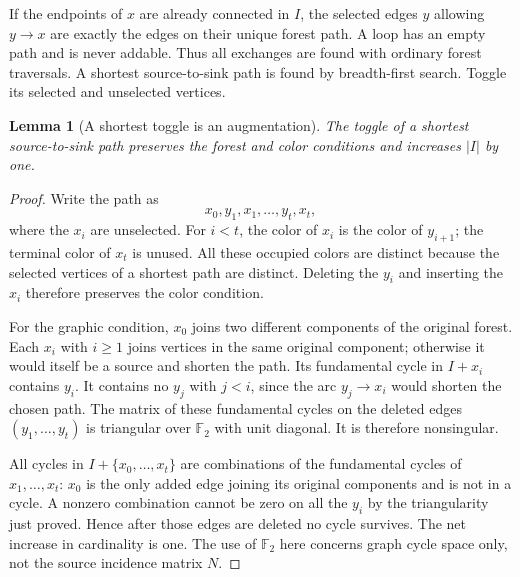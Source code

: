 \documentclass[11pt,letterpaper]{article}
\newtheorem{lemma}[theorem]{Lemma}
\theoremstyle{definition}
\theoremstyle{remark}
\newcommand{\F}{\mathbb F}
\begin{document}
If the endpoints of $x$ are already connected in $I$, the selected edges $y$
allowing $y\to x$ are exactly the edges on their unique forest path. A loop has
an empty path and is never addable. Thus all exchanges are found with ordinary
forest traversals. A shortest source-to-sink path is found by breadth-first
search. Toggle its selected and unselected vertices.

\begin{lemma}[A shortest toggle is an augmentation]\label{lem:augment}
The toggle of a shortest source-to-sink path preserves the forest and color
conditions and increases $|I|$ by one.
\end{lemma}
\begin{proof}
Write the path as
\[
 x_0,y_1,x_1,\ldots,y_t,x_t,
\]
where the $x_i$ are unselected. For $i<t$, the color of $x_i$ is the color of
$y_{i+1}$; the terminal color of $x_t$ is unused. All these occupied colors are
distinct because the selected vertices of a shortest path are distinct. Deleting
the $y_i$ and inserting the $x_i$ therefore preserves the color condition.

For the graphic condition, $x_0$ joins two different components of the original
forest. Each $x_i$ with $i\ge1$ joins vertices in the same original component;
otherwise it would itself be a source and shorten the path. Its fundamental
cycle in $I+x_i$ contains $y_i$. It contains no $y_j$ with $j<i$, since the arc
$y_j\to x_i$ would shorten the chosen path. The matrix of these fundamental
cycles on the deleted edges $(y_1,\ldots,y_t)$ is triangular over $\F_2$ with
unit diagonal. It is therefore nonsingular.

All cycles in $I+\{x_0,\ldots,x_t\}$ are combinations of the fundamental cycles
of $x_1,\ldots,x_t$: $x_0$ is the only added edge joining its original components
and is not in a cycle. A nonzero combination cannot be zero on all the $y_i$ by
the triangularity just proved. Hence after those edges are deleted no cycle
survives. The net increase in cardinality is one. The use of $\F_2$ here concerns
graph cycle space only, not the source incidence matrix $N$.
\end{proof}
\end{document}
